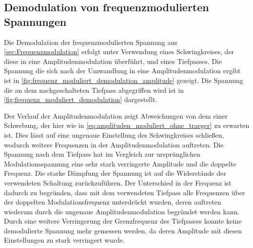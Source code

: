 \subsection{Demodulation von frequenzmodulierten Spannungen}

Die Demodulation der frequenzmodulierten Spannung aus \cref{sec:Frequenzmodulation} erfolgt
unter Verwendung eines Schwingkreises, der diese in eine Amplitudenmodulation überführt, und eines
Tiefpasses. Die Spannung die sich nach der Umwandlung in eine Amplitudenmodulation ergibt ist in 
\cref{fig:frequenz_moduliert_demodulation_amplitude} gezeigt. Die Spannung die an dem nachgeschalteten 
Tiefpass abgegriffen wird ist in \cref{fig:frequenz_moduliert_demodulation} dargestellt.





Der Verlauf der Amplitudenmodulation zeigt Abweichungen von dem einer Schwebung, der hier 
wie in \cref{eq:amplituden_moduliert_ohne_traeger} zu erwarten ist. Dies lässt auf eine ungenaue 
Einstellung des Schwingkreises schließen, wodurch weitere Frequenzen in der Amplitudenmodulation auftreten.
Die Spannung nach dem Tiefpass hat im Vergleich zur ursprünglichen Modulationsspannung eine sehr stark verringerte
Amplitude und die doppelte Frequenz. Die starke Dämpfung der Spannung ist auf die Widerstände der verwendeten 
Schaltung zurückzuführen. Der Unterschied in der Frequenz ist dadurch zu begründen, dass mit dem verwendeten 
Tiefpass alle Frequenzen über der doppelten Modulationsfrequenz unterdrückt wurden, deren auftreten wiederum durch 
die ungenaue Amplitudenmodulation begründet werden kann. Durch eine weitere Verringerung der Grenzfrequenz des
Tiefpasses konnte keine demodulierte Spannung mehr gemessen werden, da deren Amplitude mit diesen Einstellungen 
zu stark verringert wurde.
